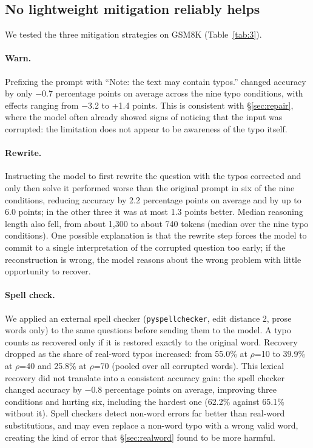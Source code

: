 \documentclass[11pt]{article}
\begin{document}
\subsection{No lightweight mitigation reliably helps}\label{sec:mitigation}

We tested the three mitigation strategies on GSM8K (Table~\ref{tab:3}).

\paragraph{Warn.} Prefixing the prompt with ``Note: the text may contain typos.'' changed accuracy by only $-$0.7 percentage points on average across the nine typo conditions, with effects ranging from $-$3.2 to +1.4 points. This is consistent with \S\ref{sec:repair}, where the model often already showed signs of noticing that the input was corrupted: the limitation does not appear to be awareness of the typo itself.

\paragraph{Rewrite.} Instructing the model to first rewrite the question with the typos corrected and only then solve it performed worse than the original prompt in six of the nine conditions, reducing accuracy by 2.2 percentage points on average and by up to 6.0 points; in the other three it was at most 1.3 points better. Median reasoning length also fell, from about 1,300 to about 740 tokens (median over the nine typo conditions). One possible explanation is that the rewrite step forces the model to commit to a single interpretation of the corrupted question too early; if the reconstruction is wrong, the model reasons about the wrong problem with little opportunity to recover.

\paragraph{Spell check.} We applied an external spell checker (\texttt{pyspellchecker}, edit distance 2, prose words only) to the same questions before sending them to the model. A typo counts as recovered only if it is restored exactly to the original word. Recovery dropped as the share of real-word typos increased: from 55.0\% at $\rho$=10 to 39.9\% at $\rho$=40 and 25.8\% at $\rho$=70 (pooled over all corrupted words). This lexical recovery did not translate into a consistent accuracy gain: the spell checker changed accuracy by $-$0.8 percentage points on average, improving three conditions and hurting six, including the hardest one (62.2\% against 65.1\% without it). Spell checkers detect non-word errors far better than real-word substitutions, and may even replace a non-word typo with a wrong valid word, creating the kind of error that \S\ref{sec:realword} found to be more harmful.
\end{document}
